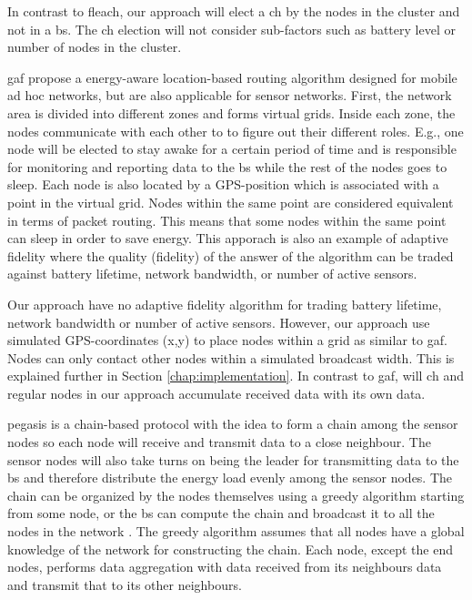 \documentclass[USenglish]{uit-thesis}
\begin{document}
In contrast to \gls{fleach}, our approach will elect a \gls{ch} by the nodes in the cluster and not in a \gls{bs}. The \gls{ch} election will not consider sub-factors such as battery level or number of nodes in the cluster.


\gls{gaf} \cite{gaf} propose a energy-aware location-based routing algorithm designed for mobile ad hoc networks, but are also applicable for sensor networks. First, the network area is divided into different zones and forms virtual grids. Inside each zone, the nodes communicate with each other to to figure out their different roles. E.g., one node will be elected to stay awake for a certain period of time and is responsible for monitoring and reporting data to the \gls{bs} while the rest of the nodes goes to sleep. Each node is also located by a GPS-position which is associated with a point in the virtual grid. Nodes within the same point are considered equivalent in terms of packet routing. This means that some nodes within the same point can sleep in order to save energy. This apporach is also an example of adaptive fidelity \cite{adfidelity} where the quality (fidelity) of the answer of the algorithm can be traded against battery lifetime, network bandwidth, or number of active sensors.

Our approach have no adaptive fidelity algorithm for trading battery lifetime, network bandwidth or number of active sensors. However, our approach use simulated GPS-coordinates (x,y) to place nodes within a grid as similar to \gls{gaf}. Nodes can only contact other nodes within a simulated broadcast width. This is explained further in Section \ref{chap:implementation}. In contrast to \gls{gaf}, will \gls{ch} and regular nodes in our approach accumulate received data  with its own data.


\Gls{pegasis} is a chain-based protocol with the idea to form a chain among the sensor nodes so each node will receive and transmit data to a close neighbour. The sensor nodes will also take turns on being the leader for transmitting data to the \gls{bs} and therefore distribute the energy load evenly among the sensor nodes. The chain can be organized by the nodes themselves using a greedy algorithm starting from some node, or the \gls{bs} can compute the chain and broadcast it to all the nodes in the network \cite{pegasis}. The greedy algorithm assumes that all nodes have a global knowledge of the network for constructing the chain. Each node, except the end nodes, performs data aggregation with data received from its neighbours data and transmit that to its other neighbours.
\end{document}

